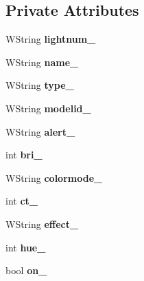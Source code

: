 \subsection*{Private Attributes}
\begin{DoxyCompactItemize}
\item 
W\+String {\bfseries lightnum\+\_\+}\hypertarget{classLight_a00174de4f7510e917846ad13dfba6def}{}\label{classLight_a00174de4f7510e917846ad13dfba6def}

\item 
W\+String {\bfseries name\+\_\+}\hypertarget{classLight_af219871de08b8f8ec36bcdd543927722}{}\label{classLight_af219871de08b8f8ec36bcdd543927722}

\item 
W\+String {\bfseries type\+\_\+}\hypertarget{classLight_a0777875dc164d6b293f1d27fa602701a}{}\label{classLight_a0777875dc164d6b293f1d27fa602701a}

\item 
W\+String {\bfseries modelid\+\_\+}\hypertarget{classLight_a8063a633a7e411195f04f385f2edb5cb}{}\label{classLight_a8063a633a7e411195f04f385f2edb5cb}

\item 
W\+String {\bfseries alert\+\_\+}\hypertarget{classLight_adcd7d695cfe250f75dc24860d7f9a231}{}\label{classLight_adcd7d695cfe250f75dc24860d7f9a231}

\item 
int {\bfseries bri\+\_\+}\hypertarget{classLight_a4ae3141b602fe44d74040175ef051054}{}\label{classLight_a4ae3141b602fe44d74040175ef051054}

\item 
W\+String {\bfseries colormode\+\_\+}\hypertarget{classLight_a4ef89913e7ea5048a14e578775c37826}{}\label{classLight_a4ef89913e7ea5048a14e578775c37826}

\item 
int {\bfseries ct\+\_\+}\hypertarget{classLight_a252e29ca6b4ff62cd6c5bf0c72d05673}{}\label{classLight_a252e29ca6b4ff62cd6c5bf0c72d05673}

\item 
W\+String {\bfseries effect\+\_\+}\hypertarget{classLight_a32966534baa11d5d84d4fd07e804e064}{}\label{classLight_a32966534baa11d5d84d4fd07e804e064}

\item 
int {\bfseries hue\+\_\+}\hypertarget{classLight_ac83fd77c5483cd0709bfcfbcc1b8ea50}{}\label{classLight_ac83fd77c5483cd0709bfcfbcc1b8ea50}

\item 
bool {\bfseries on\+\_\+}\hypertarget{classLight_ab38280fa614a9e532b0c4a7b781d16af}{}\label{classLight_ab38280fa614a9e532b0c4a7b781d16af}


\end{DoxyCompactItemize}
